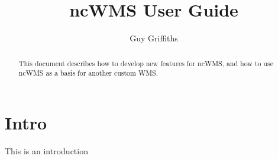 \documentclass[a4paper]{refart}
\title{ncWMS User Guide}
\author{Guy Griffiths}
\begin{document}
\maketitle

\begin{abstract}
This document describes how to develop new features for ncWMS, and how to use
ncWMS as a basis for another custom WMS.
\end{abstract}

\tableofcontents

\newpage

\section{Intro}
This is an introduction
\end{document}
